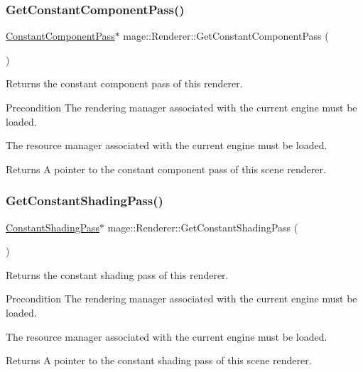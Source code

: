 \subsubsection{\texorpdfstring{Get\+Constant\+Component\+Pass()}{GetConstantComponentPass()}}
{\footnotesize\ttfamily \hyperlink{classmage_1_1_constant_component_pass}{Constant\+Component\+Pass}$\ast$ mage\+::\+Renderer\+::\+Get\+Constant\+Component\+Pass (\begin{DoxyParamCaption}{ }\end{DoxyParamCaption})}

Returns the constant component pass of this renderer.

\begin{DoxyPrecond}{Precondition}
The rendering manager associated with the current engine must be loaded. 

The resource manager associated with the current engine must be loaded. 
\end{DoxyPrecond}
\begin{DoxyReturn}{Returns}
A pointer to the constant component pass of this scene renderer. 
\end{DoxyReturn}
\hypertarget{classmage_1_1_renderer_a190ca65f3a88e4c4e607e0909674a9d9}{}\label{classmage_1_1_renderer_a190ca65f3a88e4c4e607e0909674a9d9} 
\subsubsection{\texorpdfstring{Get\+Constant\+Shading\+Pass()}{GetConstantShadingPass()}}
{\footnotesize\ttfamily \hyperlink{classmage_1_1_constant_shading_pass}{Constant\+Shading\+Pass}$\ast$ mage\+::\+Renderer\+::\+Get\+Constant\+Shading\+Pass (\begin{DoxyParamCaption}{ }\end{DoxyParamCaption})}

Returns the constant shading pass of this renderer.

\begin{DoxyPrecond}{Precondition}
The rendering manager associated with the current engine must be loaded. 

The resource manager associated with the current engine must be loaded. 
\end{DoxyPrecond}
\begin{DoxyReturn}{Returns}
A pointer to the constant shading pass of this scene renderer. 
\end{DoxyReturn}
\hypertarget{classmage_1_1_renderer_af678bc2be0c501375b448fc95adad131}{}\label{classmage_1_1_renderer_af678bc2be0c501375b448fc95adad131} 
